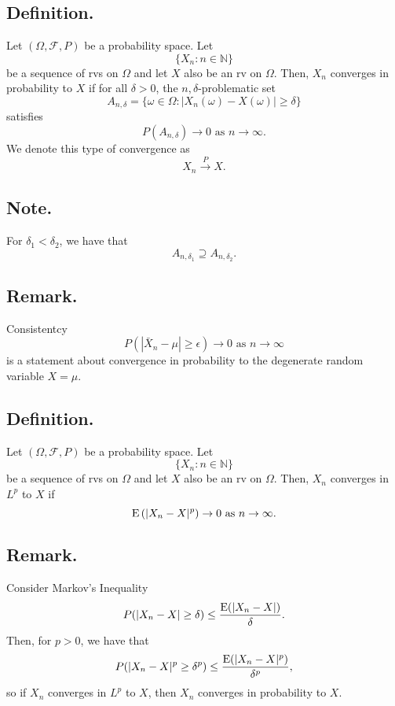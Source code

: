 \documentclass[titlepage]{article}
\begin{document}
\subsection{Definition.} Let $(\Omega, \mathcal{F}, P)$ be a probability space. Let
$$\{X_{n}: n \in \mathbb{N}\}$$
be a sequence of rvs on $\Omega$ and let $X$ also be an rv on $\Omega$. Then, $X_{n}$ converges in probability to $X$ if for all $\delta > 0$, the $n,\delta$-problematic set 
$$A_{n,\delta} = \{\omega \in \Omega: |X_{n}(\omega) - X(\omega)| \geq \delta\}$$
satisfies 
$$P(A_{n,\delta}) \to 0 \text{ as } n \to \infty.$$
We denote this type of convergence as 
$$X_{n} \xrightarrow{P} X.$$

\subsection{Note.} For $\delta_{1} < \delta_{2}$, we have that 
$$A_{n,\delta_{1}} \supseteq A_{n,\delta_{2}}.$$

\subsection{Remark.} Consistentcy 
$$P\left(|\bar{X}_{n} - \mu| \geq \epsilon\right) \to 0 \text{ as } n \to \infty$$
is a statement about convergence in probability to the degenerate random variable $X = \mu$.

\subsection{Definition.} Let $(\Omega, \mathcal{F}, P)$ be a probability space. Let
$$\{X_{n}: n \in \mathbb{N}\}$$
be a sequence of rvs on $\Omega$ and let $X$ also be an rv on $\Omega$. Then, $X_{n}$ converges in $L^{p}$ to $X$ if
$$\text{E}\left(|X_{n} - X|^{p}\right) \to 0 \text{ as } n \to \infty.$$

\subsection{Remark.} Consider Markov's Inequality 
$$P(|X_{n} - X| \geq \delta) \leq \frac{\text{E}(|X_{n} - X|)}{\delta}.$$
Then, for $p > 0$, we have that 
$$P(|X_{n} - X|^{p} \geq \delta^{p}) \leq \frac{\text{E}(|X_{n} - X|^{p})}{\delta^{p}},$$
so if $X_{n}$ converges in $L^{p}$ to $X$, then $X_{n}$ converges in probability to $X$.
\end{document}
